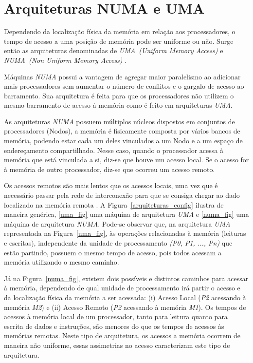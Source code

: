 \documentclass[ti]{texufpel}
\begin{document}
\chapter{Arquiteturas NUMA e UMA}

Dependendo da localização física da memória em relação aos processadores, o tempo de acesso a uma posição de memória pode ser uniforme ou não. Surge então as arquiteturas denominadas de \emph{UMA~(Uniform Memory Access)} e \emph{NUMA~(Non Uniform Memory Access)} \cite{carissimi07}.

Máquinas \emph{NUMA} possui a vantagem de agregar maior paralelismo ao adicionar mais processadores sem aumentar o número de conflitos e o gargalo de acesso ao barramento. Sua arquitetura é feita para que os processadores não utilizem o mesmo barramento de acesso à memória como é feito em arquiteturas \emph{UMA}.

As arquiteturas \emph{NUMA} possuem múltiplos núcleos dispostos em conjuntos de processadores (Nodos), a memória é fisicamente composta por vários bancos de memória, podendo estar cada um deles vinculados a um Nodo e a um espaço de endereçamento compartilhado. Nesse caso, quando o processador acessa à memória que está vinculada a si, diz-se que houve um acesso local. Se o acesso for à memória de outro processador, diz-se que ocorreu um acesso remoto.

Os acessos remotos são mais lentos que os acessos locais, uma vez que é necessário passar pela rede de interconexão para que se consiga chegar ao dado localizado na memória remota \cite{rodolfo14}. A Figura~\ref{arquiteturas_config} ilustra de maneira genérica, \ref{uma_fig} uma máquina de arquitetura \emph{UMA} e \ref{numa_fig} uma máquina de arquitetura \emph{NUMA}. Pode-se observar que, na arquitetura \emph{UMA} representada na Figura~\ref{uma_fig}, às operações relacionadas à memória (leituras e escritas), independente da unidade de processamento \emph{(P0, P1, ..., Pn)} que estão partindo, possuem o mesmo tempo de acesso, pois todos acessam a memória utilizando o mesmo caminho.

Já na Figura~\ref{numa_fig}, existem dois possíveis e distintos caminhos para acessar à memória, dependendo de qual unidade de processamento irá partir o acesso e da localização física da memória a ser acessada: (i) Acesso Local (\emph{P2} acessando à memória \emph{M2}) e (ii) Acesso Remoto (\emph{P2} acessando à memória \emph{M1}). Os tempos de acessos à memória local de um processador, tanto para leitura quanto para escrita de dados e instruções, são menores do que os tempos de acessos às memórias remotas. Neste tipo de arquitetura, os acessos a memória ocorrem de maneira não uniforme, essas assimetrias no acesso caracterizam este tipo de arquitetura.
\end{document}
